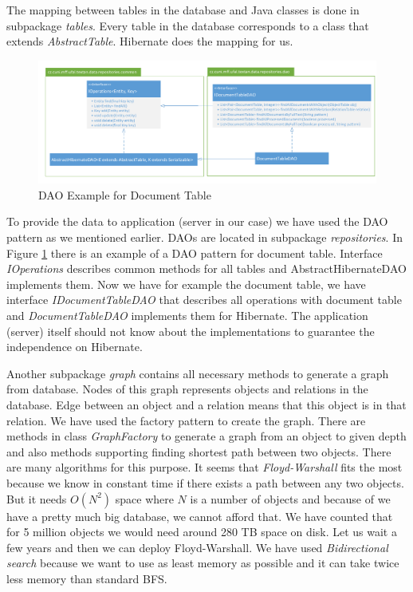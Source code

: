 The mapping between tables in the database and Java classes is done in
subpackage \emph{tables}. Every table in the database corresponds to a class
that extends \emph{AbstractTable}. Hibernate does the mapping for us.

\begin{figure}[!htb]
        \centering
        \includegraphics[width=\textwidth]{Images/DatabaseDAO}
        \caption{DAO Example for Document Table}
        \label{fig:DatabaseDAO}
\end{figure}

To provide the data to application (server in our case) we have used the DAO
pattern as we mentioned earlier. DAOs are located in subpackage
\emph{repositories}. In Figure \ref{fig:DatabaseDAO} there is an example of a
DAO pattern for document table. Interface \emph{IOperations} describes common
methods for all tables and AbstractHibernateDAO implements them. Now we have for
example the document table, we have interface \emph{IDocumentTableDAO} that
describes all operations with document table and \emph{DocumentTableDAO}
implements them for Hibernate. The application (server) itself should not know about the implementations to guarantee the independence on Hibernate.

Another subpackage \emph{graph} contains all necessary methods to generate a
graph from database. Nodes of this graph represents objects and relations in
the database. Edge between an object and a relation means that this object is in
that relation. We have used the factory pattern to create the graph. There are
methods in class \emph{GraphFactory} to generate a graph from an object to given
depth and also methods supporting finding shortest path between two objects.
There are many algorithms for this purpose. It seems that \emph{Floyd-Warshall}
fits the most because we know in constant time if there exists a path between
any two objects. But it needs $O(N^2)$ space where $N$ is a number of objects
and because of we have a pretty much big database, we cannot afford that. We
have counted that for 5 million objects we would need around 280 TB space on
disk. Let us wait a few years and then we can deploy Floyd-Warshall. We have
used \emph{Bidirectional search} because we want to use as least memory as
possible and it can take twice less memory than standard BFS.

